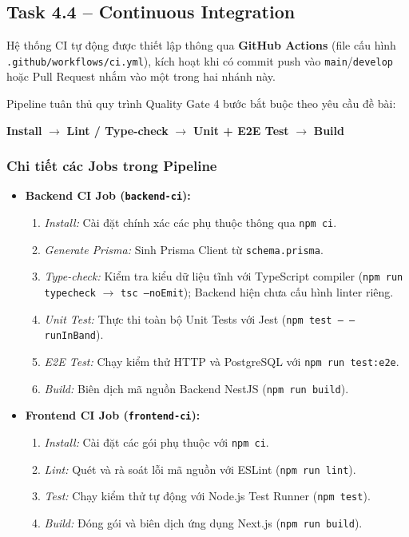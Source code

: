 \documentclass[a4paper]{article}
\begin{document}
\subsection{Task 4.4 – Continuous Integration}

Hệ thống CI tự động được thiết lập thông qua \textbf{GitHub Actions} (file cấu hình \texttt{.github/workflows/ci.yml}), kích hoạt khi có commit push vào \texttt{main}/\texttt{develop} hoặc Pull Request nhắm vào một trong hai nhánh này.

Pipeline tuân thủ quy trình Quality Gate 4 bước bắt buộc theo yêu cầu đề bài:
\begin{center}
\textbf{Install} $\longrightarrow$ \textbf{Lint / Type-check} $\longrightarrow$ \textbf{Unit + E2E Test} $\longrightarrow$ \textbf{Build}
\end{center}

\subsubsection{Chi tiết các Jobs trong Pipeline}
\begin{itemize}
    \item \textbf{Backend CI Job (\texttt{backend-ci}):}
    \begin{enumerate}
        \item \textit{Install:} Cài đặt chính xác các phụ thuộc thông qua \texttt{npm ci}.
        \item \textit{Generate Prisma:} Sinh Prisma Client từ \texttt{schema.prisma}.
        \item \textit{Type-check:} Kiểm tra kiểu dữ liệu tĩnh với TypeScript compiler (\texttt{npm run typecheck} $\rightarrow$ \texttt{tsc --noEmit}); Backend hiện chưa cấu hình linter riêng.
        \item \textit{Unit Test:} Thực thi toàn bộ Unit Tests với Jest (\texttt{npm test -- --runInBand}).
        \item \textit{E2E Test:} Chạy kiểm thử HTTP và PostgreSQL với \texttt{npm run test:e2e}.
        \item \textit{Build:} Biên dịch mã nguồn Backend NestJS (\texttt{npm run build}).
    \end{enumerate}
    \item \textbf{Frontend CI Job (\texttt{frontend-ci}):}
    \begin{enumerate}
        \item \textit{Install:} Cài đặt các gói phụ thuộc với \texttt{npm ci}.
        \item \textit{Lint:} Quét và rà soát lỗi mã nguồn với ESLint (\texttt{npm run lint}).
        \item \textit{Test:} Chạy kiểm thử tự động với Node.js Test Runner (\texttt{npm test}).
        \item \textit{Build:} Đóng gói và biên dịch ứng dụng Next.js (\texttt{npm run build}).
    \end{enumerate}
\end{itemize}
\end{document}
